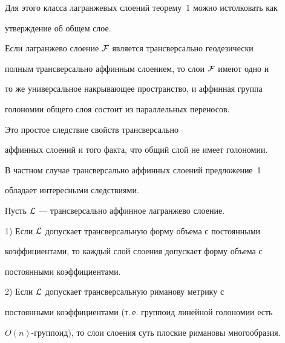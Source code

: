 Для этого класса лагранжевых слоений теорему~1 можно истолковать как


утверждение об общем слое.





\begin{prop}


Если лагранжево слоение $\cal F$ является трансверсально геодезически


полным трансверсально аффинным слоением, то слои $\cal F$ имеют одно и


то же универсальное накрывающее пространство, и аффинная группа


голономии общего слоя состоит из параллельных переносов.


\end{prop}





\begin{pf} Это простое следствие свойств трансверсально


аффинных слоений и того факта, что общий слой не имеет голономии.


\end{pf}





В частном случае трансверсально аффинных слоений предложение~1


обладает интересными следствиями.





\begin{cornonum}


Пусть $\cal L$ --- трансверсально аффинное лагранжево слоение.





1) Если $\cal L$ допускает трансверсальную форму объема с постоянными


коэффициентами, то каждый слой слоения допускает форму объема с


постоянными коэффициентами.





2) Если $\cal L$ допускает трансверсальную риманову метрику с


постоянными коэффициентами (т.\,е. группоид линейной голономии есть


$O(n)$-группоид), то слои слоения суть плоские римановы многообразия.


\end{cornonum}





